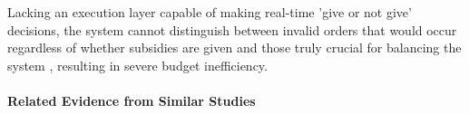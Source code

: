 Lacking an execution layer capable of making real-time 'give or not give' decisions, the system cannot distinguish between invalid orders that would occur regardless of whether subsidies are given and those truly crucial for balancing the system \parencite{emami2024integrated}, resulting in severe budget inefficiency.

\paragraph{Related Evidence from Similar Studies}





